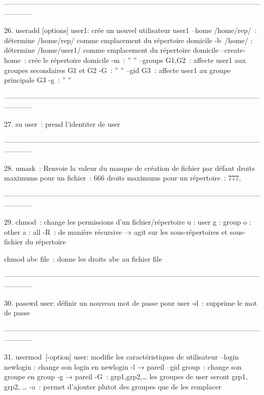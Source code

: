 \documentclass[a4paper, 10pt, onecolumn, openright, oneside]{book}
\begin{document}
------------------------------------------------------------------------------------------------------------------------

    26. useradd [options] user1: crée un nouvel utilisateur user1
--home /home/rep/ : détermine /home/rep/ comme emplacement du répertoire domicile
-b /home/ : détermine /home/user1/ comme emplacement du répertoire domicile
--create-home : crée le répertoire domicile 
-m :                                ''               ''
--groups G1,G2 : affecte user1 aux groupes secondaires G1 et G2 
-G :                                        ''                        ''
--gid G3 : affecte user1 au groupe principale G3 
-g :                   ''                           ''

------------------------------------------------------------------------------------------------------------------------

    27. su user : prend l'identiter de user

------------------------------------------------------------------------------------------------------------------------

    28. umask : Renvoie la valeur du masque de création de fichier par défaut
droits maximums pour un fichier : 666
droits maximums pour un répertoire : 777,

------------------------------------------------------------------------------------------------------------------------

    29. chmod : change les permissions d'un fichier/répertoire
u : user
g : group
o : other
a : all
-R : de manière récursive --» agit sur les sous-répertoires et sous-fichier du répertoire

chmod abc file : donne les droits abc au fichier file

------------------------------------------------------------------------------------------------------------------------

    30. passwd user: définir un nouveau mot de passe pour user
-d : supprime le mot de passe

------------------------------------------------------------------------------------------------------------------------

    31. usermod [-option] user: modifie les caractéristiques de utilisateur
--login newlogin : change son login en newlogin
-l → pareil 
--gid group : change son groupe en group
-g → pareil
-G : grp1,grp2,… les groupes de user seront grp1, grp2, …
-a : permet d’ajouter plutot des groupes que de les remplacer 
\end{document}
